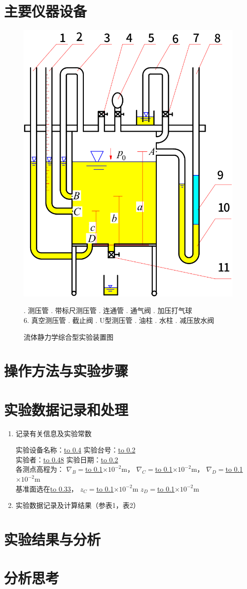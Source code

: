 \documentclass[UTF8,AutoFakeBold,a4paper]{article}  %
\begin{document}
    \section{主要仪器设备}
    \begin{figure}[H]
        \centering 
        \includegraphics[width=0.4\linewidth]{figures/exp1.png}
        \caption{流体静力学综合型实验装置图}
        \par
        {. 测压管 . 带标尺测压管 . 连通管 . 通气阀 . 加压打气球 \\ 
        6. 真空测压管 . 截止阀 . U型测压管 . 油柱 . 水柱 . 减压放水阀 \par}
    \end{figure}        
    \section{操作方法与实验步骤}
    \section{实验数据记录和处理}
    \begin{enumerate}
        \linespread{1.5}
        \item 记录有关信息及实验常数
        \par 
        实验设备名称：\underline{\hbox to 0.4\linewidth{\hfill \hfill}}
        实验台号：\underline{\hbox to 0.2\linewidth{\hfill \hfill}} \\ 
        实验者：\underline{\hbox to 0.48\linewidth{\hfill \hfill}}
        实验日期：\underline{\hbox to 0.2\linewidth{\hfill \hfill}} \\ 
        各测点高程为：
        $ \nabla_{B}= $\underline{\hbox to 0.1\linewidth{\hfill \hfill}}$ \times10^{-2}\mathrm{m} $，
        $ \nabla_{C}= $\underline{\hbox to 0.1\linewidth{\hfill \hfill}}$ \times10^{-2}\mathrm{m} $，
        $ \nabla_{D}= $\underline{\hbox to 0.1\linewidth{\hfill \hfill}}$ \times10^{-2}\mathrm{m} $ \\ 
        基准面选在\underline{\hbox to 0.33\linewidth{\hfill \hfill}}，
        $ z_{C}= $\underline{\hbox to 0.1\linewidth{\hfill \hfill}}$ \times10^{-2}\mathrm{m} $
        $ z_{D}= $\underline{\hbox to 0.1\linewidth{\hfill \hfill}}$ \times10^{-2}\mathrm{m} $
        \item 实验数据记录及计算结果（参表1，表2）
    \end{enumerate}
    \section{实验结果与分析}
    \section{分析思考}
\end{document}
